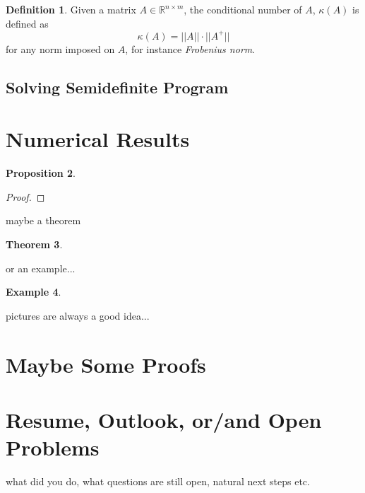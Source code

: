 \documentclass[12pt]{amsart}
\numberwithin{equation}{section}
\newtheorem{thm}{Theorem}
\newtheorem{prop}[thm]{Proposition}
\theoremstyle{definition}
\newtheorem{definition}[thm]{Definition}
\newtheorem{example}[thm]{Example}
\numberwithin{thm}{section}
\begin{document}
\begin{definition}
     Given a matrix $A \in \mathbb{R}^{n \times m}$, the conditional number of $A$, $\kappa(A)$ is defined as
     \begin{equation}
          \kappa(A) = ||A|| \cdot ||A^+||
     \end{equation}
     for any norm imposed on $A$, for instance \emph{Frobenius norm}.
\end{definition}

\subsection{Solving Semidefinite Program}
\label{Sec:Solving Semidefinite Program}


\section{Numerical Results}


\begin{prop}

\end{prop}

\begin{proof}

\end{proof}

maybe a theorem


\begin{thm}

\end{thm}

or an example...
\begin{example}

\end{example}

pictures are always a good idea...



\section{Maybe Some Proofs}


\section{Resume, Outlook, or/and Open Problems}
\label{Sec:Outlook}


what did you do, what questions are still open, natural next steps etc. 





\end{document}
